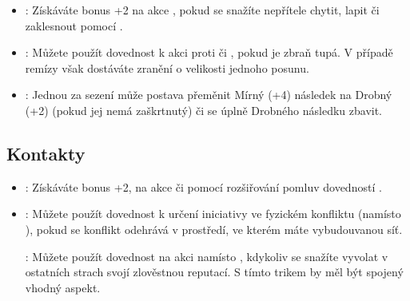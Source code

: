 \begin{itemize}
\item{}:
\label{sec:kondice-zapas}
Získáváte bonus +2 na akce , pokud se snažíte nepřítele chytit, lapit či zaklesnout pomocí .

\item{}:
\label{sec:kondice-drsnak}
Můžete použít dovednost  k akci  proti  či , pokud je zbraň tupá. V případě remízy však dostáváte zranění o velikosti jednoho posunu.

\item{}:
\label{sec:kondice-nezdolny}
Jednou za sezení může postava přeměnit Mírný (+4) následek na Drobný (+2) (pokud jej nemá zaškrtnutý) či se úplně Drobného následku zbavit.
\end{itemize}

\subsection{Kontakty}
\label{sec:trik-kontakty}

\begin{itemize}
\item{}:
\label{sec:kontakty-drbna}
Získáváte bonus +2, na akce  či  pomocí rozšiřování pomluv dovedností .

\item{}:
\label{sec:kontakty-ucho}
Můžete použít dovednost  k určení iniciativy ve fyzickém konfliktu (namísto ), pokud se konflikt odehrává v prostředí, ve kterém máte vybudouvanou síť.

:
\label{sec:kontakty-reputace}
Můžete použít dovednost  na akci  namísto , kdykoliv se snažíte vyvolat v ostatních strach svojí zlověstnou reputací. S tímto trikem by měl být spojený vhodný aspekt.
\end{itemize}

